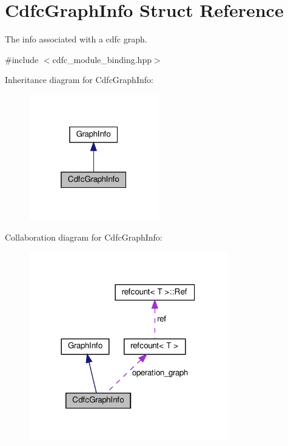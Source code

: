 \hypertarget{structCdfcGraphInfo}{}\section{Cdfc\+Graph\+Info Struct Reference}
\label{structCdfcGraphInfo}


The info associated with a cdfc graph.  




{\ttfamily \#include $<$cdfc\+\_\+module\+\_\+binding.\+hpp$>$}



Inheritance diagram for Cdfc\+Graph\+Info\+:
\nopagebreak
\begin{figure}[H]
\begin{center}
\leavevmode
\includegraphics[width=160pt]{dc/d9f/structCdfcGraphInfo__inherit__graph}
\end{center}
\end{figure}


Collaboration diagram for Cdfc\+Graph\+Info\+:
\nopagebreak
\begin{figure}[H]
\begin{center}
\leavevmode
\includegraphics[width=245pt]{d4/d25/structCdfcGraphInfo__coll__graph}
\end{center}
\end{figure}
